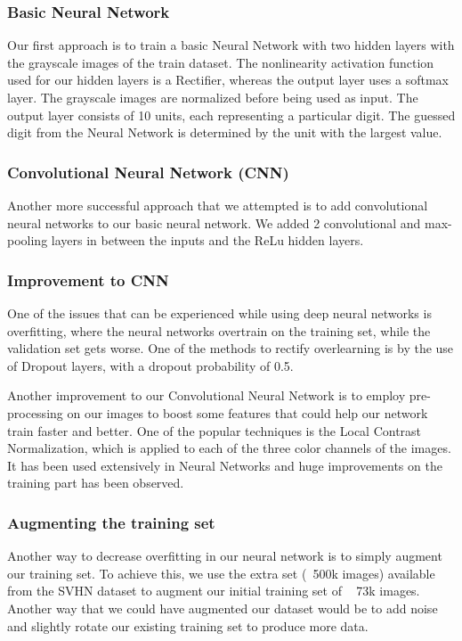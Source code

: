 \documentclass{article} %
\begin{document}
\subsubsection{Basic Neural Network}
Our first approach is to train a basic Neural Network with two hidden layers with the grayscale images of the train dataset. The nonlinearity activation function used for our hidden layers is a Rectifier, whereas the output layer uses a softmax layer. The grayscale images are normalized before being used as input. The output layer consists of 10 units, each representing a particular digit. The guessed digit from the Neural Network is determined by the unit with the largest value.

\subsubsection{Convolutional Neural Network (CNN)}
Another more successful approach that we attempted is to add convolutional neural networks to our basic neural network. We added 2 convolutional and max-pooling layers in between the inputs and the ReLu hidden layers.


\subsubsection{Improvement to CNN}
One of the issues that can be experienced while using deep neural networks is overfitting, where the neural networks overtrain on the training set, while the validation set gets worse. One of the methods to rectify overlearning is by the use of Dropout layers, with a dropout probability of 0.5.

Another improvement to our Convolutional Neural Network is to employ pre-processing on our images to boost some features that could help our network train faster and better. One of the popular techniques is the Local Contrast Normalization, which is applied to each of the three color channels of the images. It has been used extensively in Neural Networks and huge improvements on the training part has been observed.

\subsubsection{Augmenting the training set}
Another way to decrease overfitting in our neural network is to simply augment our training set. To achieve this, we use the extra set (~500k images) available from the SVHN dataset to augment our initial training set of ~ 73k images. Another way that we could have augmented our dataset would be to add noise and slightly rotate our existing training set to produce more data. 
\end{document}
